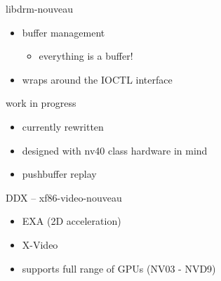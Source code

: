 \documentclass[11pt,english,compress]{beamer}
\begin{document}
		\begin{frame}
			\begin{block}{libdrm-nouveau}
				\begin{itemize}
					\item buffer management
						\begin{itemize}
							\item everything is a buffer!
						\end{itemize}
					\item wraps around the IOCTL interface
				\end{itemize}
			\end{block}
			\begin{block}{work in progress}
				\begin{itemize}
					\item currently rewritten
					\item designed with nv40 class hardware in mind
					\item pushbuffer replay
				\end{itemize}
			\end{block}
		\end{frame}

		\begin{frame}
			\begin{block}{DDX -- xf86-video-nouveau}
				\begin{itemize}
					\item EXA (2D acceleration) 
					\item X-Video
					\item supports full range of GPUs (NV03 - NVD9)
				\end{itemize}
			\end{block}
		\end{frame}
\end{document}
